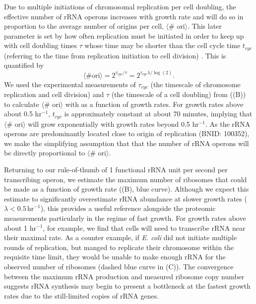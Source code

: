 Due to multiple initiations of chromosomal replication per cell doubling, the
effective number of rRNA operons increases with growth rate and will do so in
proportion to the average number of origins per cell, $\langle$\# ori$\rangle$.
This later parameter is set by how often replication must be initiated in order
to keep up with cell doubling times $\tau$ whose time may be shorter than the
cell cycle time $t_{cyc}$ (referring to the time from replication initiation to
cell division) \cite{dennis2004}. This is quantified by
\begin{equation}
    \langle \text{\# ori} \rangle = 2^{\tau_{cyc} / \tau} = 2^{\tau_{cyc} \lambda / \log(2)}.
    \label{eq:Nori}
\end{equation}
We used the experimental measurements of $\tau_{cyc}$ (the timescale of
chromosome replication and cell division) and $\tau$ (the timescale of a cell
doubling) from
\cite{si2017} ((B)) to calculate
$\langle$\# ori$\rangle$  with  as a function of growth rates. For
growth rates above about 0.5 hr$^{-1}$, $t_{cyc}$ is approximately constant at
about 70 minutes, implying that $\langle$\# ori$\rangle$ will grow
exponentially with growth rates beyond 0.5 hr$^{-1}$. As the rRNA operons are predominantly located
close to origin of replication (BNID: 100352), we make the simplifying
assumption that that the number of rRNA operons  will be directly proportional
to $\langle$\# ori$\rangle$.

Returning to our rule-of-thumb of 1 functional rRNA unit per second per
transcribing operon, we estimate the maximum number of ribosomes that could be made as a function of
growth rate ((B), blue curve). Although we expect this
estimate to significantly overestimate rRNA abundance at slower growth rates
($\lambda < 0.5\, \text{hr}^{-1}$), this provides a useful reference alongside the
proteomic measurements particularly in the regime of fast growth. For growth
rates above about 1 hr$^{-1}$, for example, we find that
cells will need to transcribe rRNA near their maximal rate. As a counter
example, if \textit{E. coli} did not initiate multiple rounds of replication,
but manged to replicate their chromosome within the requisite time limit,
they would be unable to make enough rRNA for the observed number of ribosomes
(dashed blue curve in (C)). The convergence between the
maximum rRNA production and measured ribosome copy number suggests rRNA
synthesis may begin to present a bottleneck at the fastest growth rates due to
the still-limited copies of rRNA genes.


